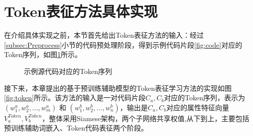 \section{Token表征方法具体实现}
\label{sec:achieve}
在介绍具体实现之前，本节首先给出Token表征方法的输入：经过\ref{subsec:Preprocess}小节的代码预处理阶段，得到示例代码片段\ref{fig:code}对应的Token序列，如图\ref{fig:tokencode}所示。
\begin{figure}[H] 
  \centering  %
  \caption{示例源代码对应的Token序列}    %
  \label{fig:tokencode}    %
\end{figure}

接下来，本章提出的基于预训练辅助模型的Token表征学习方法的实现如图\ref{fig:token}所示。该方法的输入是一对代码片段$C_{a},C_{b}$对应的Token序列，表示为$\left( w_{1}^{a},w_{2}^{a},\ldots,w_{m}^{a}\right)$ 和 $\left( w_{1}^{b},w_{2}^{b},\ldots,w_{n}^{b} \right)$，输出是$C_{a},C_{b}$对应的属性特征向量 $V_{a}^{Token},V_{b}^{Token}$，整体采用Siamese架构，两个子网络共享权值,从下到上，主要包括预训练辅助词嵌入、Token代码表征两个阶段。

